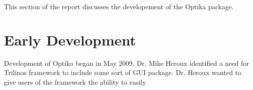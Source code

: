 This section of the report discusses the developement of the Optika package.

\section{Early Development}
Development of Optika began in May 2009. Dr. Mike Heroux identified a need for
Trilinos framework to include some sort of GUI package. Dr. Heroux wanted to
give users of the framework the ability to easily 
